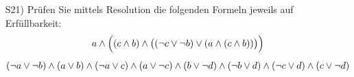 \begin{exercise}
  \begin{enumerate}
    \item [S21)]
  \label{logic:resolution-3}
  Prüfen Sie mittels Resolution die folgenden Formeln jeweils auf Erfüllbarkeit:
  \begin{gather*}
    a \wedge \Bigl(( c \wedge b) \wedge \bigl((\neg c \vee \neg b ) \vee
    (a \wedge (c \wedge b))\bigr)\Bigr) \\[1ex]
      (\neg a \vee \neg b) \wedge
      (     a \vee      b) \wedge
      (\neg a \vee  c ) \wedge
      ( a \vee \neg c) \wedge {}
      ( b \vee \neg d) \wedge
      (\neg b  \vee d) \wedge
      (\neg c \vee d) \wedge
      (c \vee \neg d)
  \end{gather*}
 \end{enumerate}
\end{exercise}
